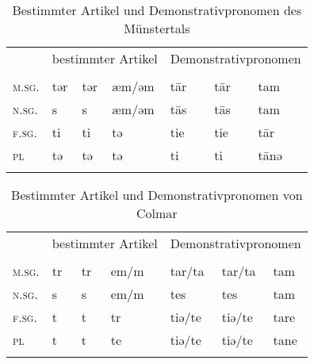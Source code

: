 \begin{table}[H]
	\caption{Bestimmter Artikel und Demonstrativpronomen des Münstertals \citep[47-48]{Mankel1886}}\label{table98}
	\begin{tabular}{lllllll}
		\lsptoprule
		& \multicolumn{3}{c}{bestimmter Artikel} & \multicolumn{3}{c}{Demonstrativpronomen} \\\cmidrule(lr){2-4}\cmidrule(lr){5-7}
		& \NOM & \AKK & \DAT & \NOM & \AKK & \DAT\\\midrule
		\textsc{m.sg.} & tər & tər & æm/əm & t\=ar & t\=ar & tam\\
		\textsc{n.sg.} & s & s & æm/əm & t\=as & t\=as & tam\\
		\textsc{f.sg.} & ti & ti & tə & tie & tie & t\=ar\\
		\textsc{pl} & tə & tə & tə & ti & ti & t\=anə\\
		\lspbottomrule
	\end{tabular}
\end{table}


\begin{table}[H]
	\caption{Bestimmter Artikel und Demonstrativpronomen von Colmar \citep[68-70, 83]{Henry1900}}\label{table99}
	\begin{tabular}{lllllll}
		\lsptoprule
		& \multicolumn{3}{c}{bestimmter Artikel} & \multicolumn{3}{c}{Demonstrativpronomen} \\\cmidrule(lr){2-4}\cmidrule(lr){5-7}
		& \NOM & \AKK & \DAT & \NOM & \AKK & \DAT\\\midrule
		\textsc{m.sg.} & tr & tr & em/m & tar/ta & tar/ta & tam\\
		\textsc{n.sg.} & s & s & em/m & tes & tes & tam\\
		\textsc{f.sg.} & t & t & tr & tiə/te & tiə/te & tare\\
		\textsc{pl} & t & t & te & tiə/te & tiə/te & tane\\
		\lspbottomrule
	\end{tabular}

\end{table}


